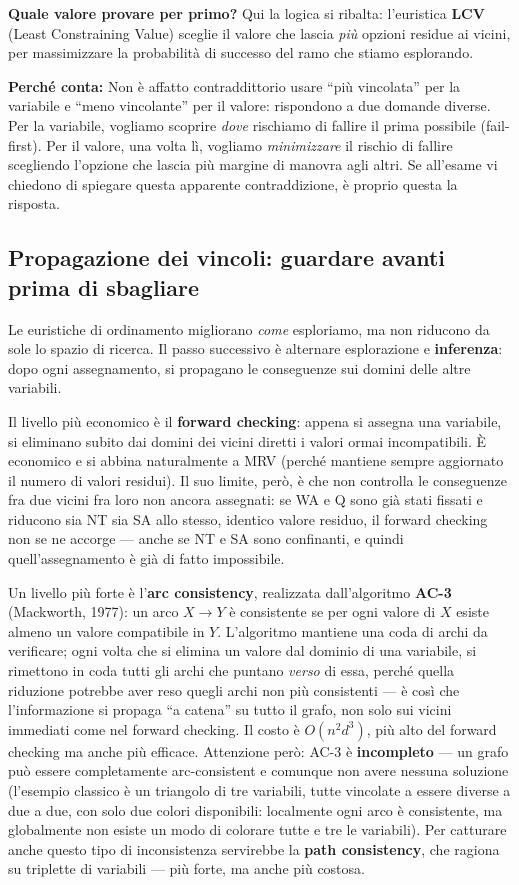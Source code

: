 \documentclass[11pt,a4paper]{article}
\newcommand{\perche}[1]{\begin{nota}\textbf{Perché conta:} #1\end{nota}}
\begin{document}
\textbf{Quale valore provare per primo?} Qui la logica si ribalta: l'euristica \textbf{LCV} (Least Constraining Value) sceglie il valore che lascia \emph{più} opzioni residue ai vicini, per massimizzare la probabilità di successo del ramo che stiamo esplorando.

\perche{Non è affatto contraddittorio usare ``più vincolata'' per la variabile e ``meno vincolante'' per il valore: rispondono a due domande diverse. Per la variabile, vogliamo scoprire \emph{dove} rischiamo di fallire il prima possibile (fail-first). Per il valore, una volta lì, vogliamo \emph{minimizzare} il rischio di fallire scegliendo l'opzione che lascia più margine di manovra agli altri. Se all'esame vi chiedono di spiegare questa apparente contraddizione, è proprio questa la risposta.}

\subsection{Propagazione dei vincoli: guardare avanti prima di sbagliare}

Le euristiche di ordinamento migliorano \emph{come} esploriamo, ma non riducono da sole lo spazio di ricerca. Il passo successivo è alternare esplorazione e \textbf{inferenza}: dopo ogni assegnamento, si propagano le conseguenze sui domini delle altre variabili.

Il livello più economico è il \textbf{forward checking}: appena si assegna una variabile, si eliminano subito dai domini dei vicini diretti i valori ormai incompatibili. È economico e si abbina naturalmente a MRV (perché mantiene sempre aggiornato il numero di valori residui). Il suo limite, però, è che non controlla le conseguenze fra due vicini fra loro non ancora assegnati: se WA e Q sono già stati fissati e riducono sia NT sia SA allo stesso, identico valore residuo, il forward checking non se ne accorge --- anche se NT e SA sono confinanti, e quindi quell'assegnamento è già di fatto impossibile.

Un livello più forte è l'\textbf{arc consistency}, realizzata dall'algoritmo \textbf{AC-3} (Mackworth, 1977): un arco $X \to Y$ è consistente se per ogni valore di $X$ esiste almeno un valore compatibile in $Y$. L'algoritmo mantiene una coda di archi da verificare; ogni volta che si elimina un valore dal dominio di una variabile, si rimettono in coda tutti gli archi che puntano \emph{verso} di essa, perché quella riduzione potrebbe aver reso quegli archi non più consistenti --- è così che l'informazione si propaga ``a catena'' su tutto il grafo, non solo sui vicini immediati come nel forward checking. Il costo è $O(n^2 d^3)$, più alto del forward checking ma anche più efficace. Attenzione però: AC-3 è \textbf{incompleto} --- un grafo può essere completamente arc-consistent e comunque non avere nessuna soluzione (l'esempio classico è un triangolo di tre variabili, tutte vincolate a essere diverse a due a due, con solo due colori disponibili: localmente ogni arco è consistente, ma globalmente non esiste un modo di colorare tutte e tre le variabili). Per catturare anche questo tipo di inconsistenza servirebbe la \textbf{path consistency}, che ragiona su triplette di variabili --- più forte, ma anche più costosa.
\end{document}
